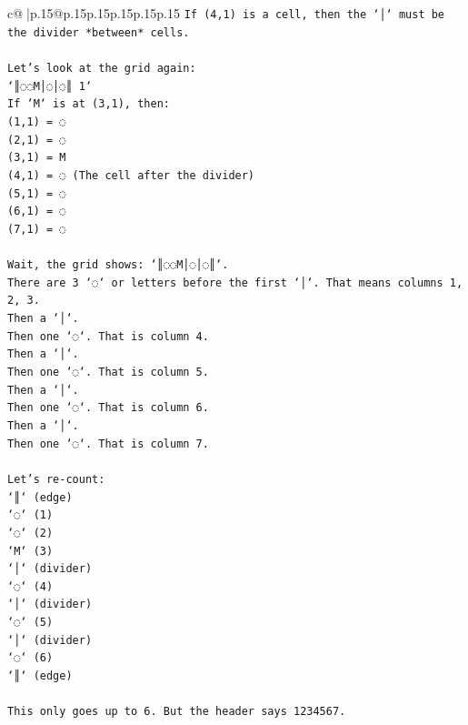 \documentclass{article}
\begin{document}
{\begin{supertabular}{c@{$\;$}|p{.15\linewidth}@{}p{.15\linewidth}p{.15\linewidth}p{.15\linewidth}p{.15\linewidth}p{.15\linewidth}}
{{{\texttt{If (4,1) is a cell, then the `│` must be the divider *between* cells.} \\
\\ 
\texttt{Let's look at the grid again:} \\
\texttt{`║◌◌M│◌│◌║ 1`} \\
\texttt{If `M` is at (3,1), then:} \\
\texttt{(1,1) = ◌} \\
\texttt{(2,1) = ◌} \\
\texttt{(3,1) = M} \\
\texttt{(4,1) = ◌ (The cell after the divider)} \\
\texttt{(5,1) = ◌} \\
\texttt{(6,1) = ◌} \\
\texttt{(7,1) = ◌} \\
\\ 
\texttt{Wait, the grid shows: `║◌◌M│◌│◌║`.} \\
\texttt{There are 3 `◌` or letters before the first `│`. That means columns 1, 2, 3.} \\
\texttt{Then a `│`.} \\
\texttt{Then one `◌`. That is column 4.} \\
\texttt{Then a `│`.} \\
\texttt{Then one `◌`. That is column 5.} \\
\texttt{Then a `│`.} \\
\texttt{Then one `◌`. That is column 6.} \\
\texttt{Then a `│`.} \\
\texttt{Then one `◌`. That is column 7.} \\
\\ 
\texttt{Let's re{-}count:} \\
\texttt{`║` (edge)} \\
\texttt{`◌` (1)} \\
\texttt{`◌` (2)} \\
\texttt{`M` (3)} \\
\texttt{`│` (divider)} \\
\texttt{`◌` (4)} \\
\texttt{`│` (divider)} \\
\texttt{`◌` (5)} \\
\texttt{`│` (divider)} \\
\texttt{`◌` (6)} \\
\texttt{`║` (edge)} \\
\\ 
\texttt{This only goes up to 6. But the header says 1234567.} \\
}}}
\end{supertabular}}
\end{document}
